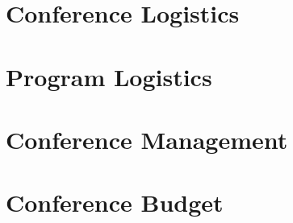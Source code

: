\documentclass[12pt, letterpaper]{article}
\begin{document}
\newpage
\section{Conference Logistics}

\newpage
\section{Program Logistics}

\newpage
\section{Conference Management}


\newpage
\section{Conference Budget}
\end{document}
